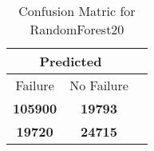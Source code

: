 \begin{table}[] 
\caption{Confusion Matric for RandomForest20} 
\label{Table: Prediction Accuracy-DMDRandomForest20OnlySunEKF-resetReflection-Reflection} 
\centering 
\begin{tabular} 
 {@{}ccc@{}} 
\toprule 
\multicolumn{2}{c}{\textbf{Predicted}}
 \\ \midrule 
\multicolumn{1}{|c|}{Failure} & 
\multicolumn{1}{c|}{No Failure}
 \\ \midrule 
\multicolumn{1}{|c|}{\color{green}\textbf{105900}} & 
\multicolumn{1}{c|}{\color{red}\textbf{19793}}
 \\ \midrule 
\multicolumn{1}{|c|}{\color{red}\textbf{19720}} & 
\multicolumn{1}{c|}{\color{green}\textbf{24715}}
 \\ \bottomrule 
\end{tabular} 
\end{table} 
